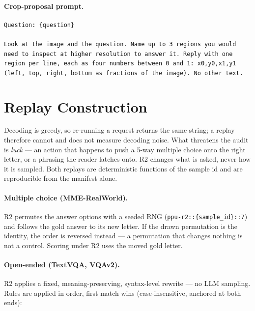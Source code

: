 \documentclass[10pt]{article}
\begin{document}
\paragraph{Crop-proposal prompt.}
\label{sec:prompts:proposal}
\begin{lstlisting}
Question: {question}

Look at the image and the question. Name up to 3 regions you would need to inspect at higher resolution to answer it. Reply with one region per line, each as four numbers between 0 and 1: x0,y0,x1,y1 (left, top, right, bottom as fractions of the image). No other text.
\end{lstlisting}

\section{Replay Construction}
\label{sec:replays}

Decoding is greedy, so re-running a request returns the same string; a
replay therefore cannot and does not measure decoding noise. What threatens
the audit is \emph{luck} --- an action that happens to push a 5-way multiple
choice onto the right letter, or a phrasing the reader latches onto. R2
changes what is asked, never how it is sampled. Both replays are
deterministic functions of the sample id and are reproducible from the
manifest alone.

\paragraph{Multiple choice (MME-RealWorld).}
R2 permutes the answer options with a seeded RNG
(\texttt{ppu-r2::\{sample\_id\}::7}) and follows the gold answer to its new
letter. If the drawn permutation is the identity, the order is reversed
instead --- a permutation that changes nothing is not a control. Scoring
under R2 uses the moved gold letter.

\paragraph{Open-ended (TextVQA, VQAv2).}
R2 applies a fixed, meaning-preserving, syntax-level rewrite --- no LLM
sampling. Rules are applied in order, first match wins
(case-insensitive, anchored at both ends):
\end{document}
